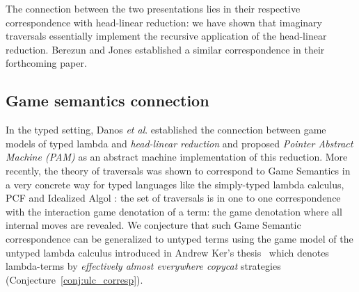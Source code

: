 \documentclass{elsarticle}
\theoremstyle{plain}
\theoremstyle{definition}
\theoremstyle{remark}
\newcommand{\etal}{\textit{et al}. }
\begin{document}
The connection between the two presentations lies in their respective correspondence with head-linear reduction: we have shown that imaginary traversals essentially implement the recursive application of the head-linear reduction. Berezun and Jones established a similar correspondence in their forthcoming paper.

\subsection*{Game semantics connection}

In the typed setting, Danos \etal established the connection between game models of typed lambda and \emph{head-linear reduction} and proposed \emph{Pointer Abstract Machine (PAM)} as an abstract machine implementation of this reduction\cite{danosherbelinregnier1996}.
More recently, the theory of traversals \cite{OngLics2006} was shown to correspond to Game Semantics in a very concrete way for typed languages like the simply-typed lambda calculus, PCF and Idealized Algol \cite{BlumPhd}: the set of traversals is in one to one correspondence with the interaction game denotation of a term: the game denotation where all internal moves are revealed. We conjecture that such Game Semantic correspondence can be generalized to untyped terms using the game model of the untyped lambda calculus introduced in Andrew Ker's thesis~\cite{KerThesis} which denotes lambda-terms by \emph{effectively almost everywhere copycat} strategies (Conjecture~\ref{conj:ulc_corresp}).



\end{document}
